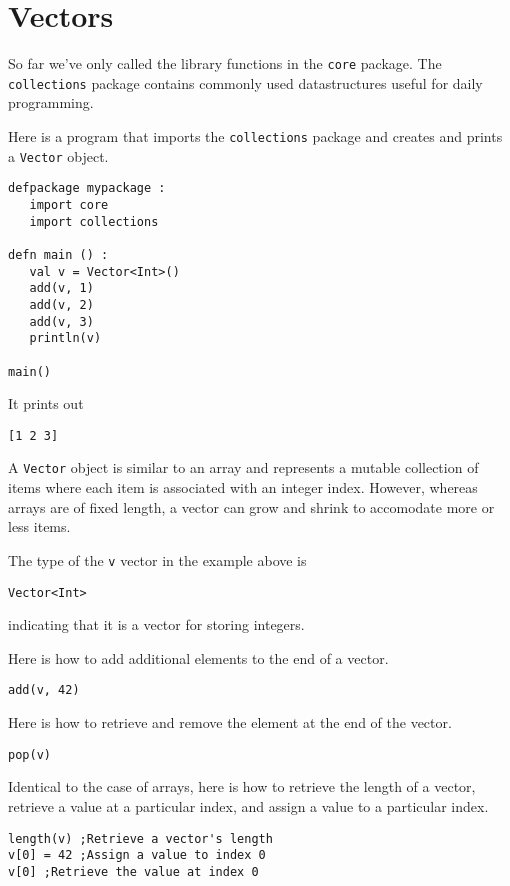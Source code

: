 \documentclass[10pt,oneside]{book}
\begin{document}
\section{Vectors}
So far we've only called the library functions in the \texttt{\frenchspacing core} package. The \texttt{\frenchspacing collections} package contains commonly used datastructures useful for daily programming.

Here is a program that imports the \texttt{\frenchspacing collections} package and creates and prints a \texttt{\frenchspacing Vector} object.
\begin{lstlisting}
defpackage mypackage :
   import core
   import collections

defn main () :
   val v = Vector<Int>()
   add(v, 1)
   add(v, 2)
   add(v, 3)
   println(v)

main()
\end{lstlisting}
It prints out
\begin{lstlisting}
[1 2 3]
\end{lstlisting}

A \texttt{\frenchspacing Vector} object is similar to an array and represents a mutable collection of items where each item is associated with an integer index. However, whereas arrays are of fixed length, a vector can grow and shrink to accomodate more or less items. 

The type of the \texttt{\frenchspacing v} vector in the example above is 
\begin{lstlisting}
Vector<Int>
\end{lstlisting}
indicating that it is a vector for storing integers.

Here is how to add additional elements to the end of a vector.
\begin{lstlisting}
add(v, 42)
\end{lstlisting}

Here is how to retrieve and remove the element at the end of the vector.
\begin{lstlisting}
pop(v)
\end{lstlisting}

Identical to the case of arrays, here is how to retrieve the length of a vector, retrieve a value at a particular index, and assign a value to a particular index.
\begin{lstlisting}
length(v) ;Retrieve a vector's length
v[0] = 42 ;Assign a value to index 0
v[0] ;Retrieve the value at index 0
\end{lstlisting}
\end{document}
